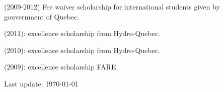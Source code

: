 \documentclass[letterpaper]{article}
\def\footerlink{}
\renewenvironment{itemize}{
  \begin{list}{}{
    \setlength{\leftmargin}{0em}
  }
}{
  \end{list}
}
\begin{document}
\begin{itemize}
    \item (2009-2012) Fee waiver scholarship for international students given
    by gouvernment of Quebec.
    \item (2011): excellence scholarship from Hydro-Quebec.
    \item (2010): excellence scholarship from Hydro-Quebec.
    \item (2009): excellence scholarship FARE.
\end{itemize}




\bigskip

\begin{center}
  \begin{footnotesize}
    Last update: \ddmmyyyydate \today \\
    \href{\footerlink}{\texttt{\footerlink}}
  \end{footnotesize}
\end{center}
\end{document}
